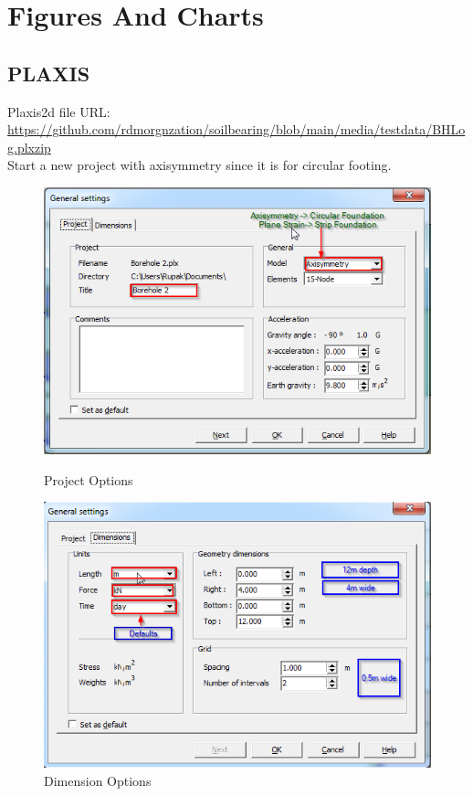 \chapter{Figures And Charts}
\section{PLAXIS}
Plaxis2d file URL: \url{https://github.com/rdmorgnzation/soilbearing/blob/main/media/testdata/BHLog.plxzip}\\
\vfill
Start a new project with axisymmetry since it is for circular footing.
\begin{figure}[hbtp]
  \centering
  \includegraphics[height=0.33\textheight]{images/plx/a (1).png}
  \caption{Project Options}
  \vfill
  \includegraphics[height=0.33\textheight]{images/plx/a (2).png}
  \caption{Dimension Options}
\end{figure}
\vfill
\pagebreak

